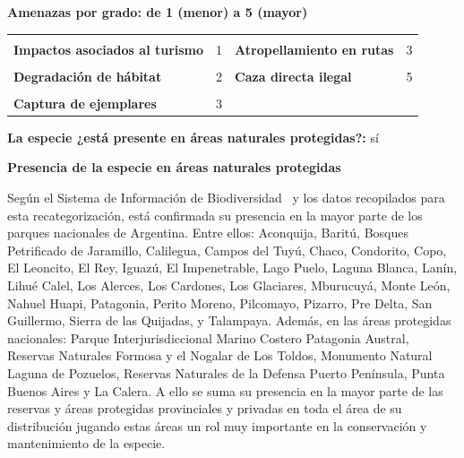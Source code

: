\documentclass[
  x11names]{article}
\begin{document}
\textbf{Amenazas por grado: de 1 (menor) a 5 (mayor)}

\begin{tabu} to 
\toprule
\textbf{} &  & \textbf{} & \\
\textbf{Impactos asociados al turismo} & 1 & \textbf{Atropellamiento en rutas} & 3\\
\textbf{} &  & \textbf{} & \\
\textbf{Degradación de hábitat} & 2 & \textbf{Caza directa ilegal} & 5\\
\textbf{} &  & \textbf{} & \\
\textbf{Captura de ejemplares} & 3 & \textbf{} & \\
\bottomrule
\end{tabu}

\textbf{La especie ¿está presente en áreas naturales protegidas?:} sí

\textbf{Presencia de la especie en áreas naturales protegidas}

Según el Sistema de Información de Biodiversidad ~y los datos
recopilados para esta recategorización, está confirmada su presencia en
la mayor parte de los parques nacionales de Argentina. Entre ellos:
Aconquija, Baritú, Bosques Petrificado de Jaramillo, Calilegua, Campos
del Tuyú, Chaco, Condorito, Copo, El Leoncito, El Rey, Iguazú, El
Impenetrable, Lago Puelo, Laguna Blanca, Lanín, Lihué Calel, Los
Alerces, Los Cardones, Los Glaciares, Mburucuyá, Monte León, Nahuel
Huapi, Patagonia, Perito Moreno, Pilcomayo, Pizarro, Pre Delta, San
Guillermo, Sierra de las Quijadas, y Talampaya. Además, en las áreas
protegidas nacionales: Parque Interjurisdiccional Marino Costero
Patagonia Austral, Reservas Naturales Formosa y el Nogalar de Los
Toldos, Monumento Natural Laguna de Pozuelos, Reservas Naturales de la
Defensa Puerto Península, Punta Buenos Aires y La Calera. A ello se suma
su presencia en la mayor parte de las reservas y áreas protegidas
provinciales y privadas en toda el área de su distribución jugando estas
áreas un rol muy importante en la conservación y mantenimiento de la
especie.
\end{document}
